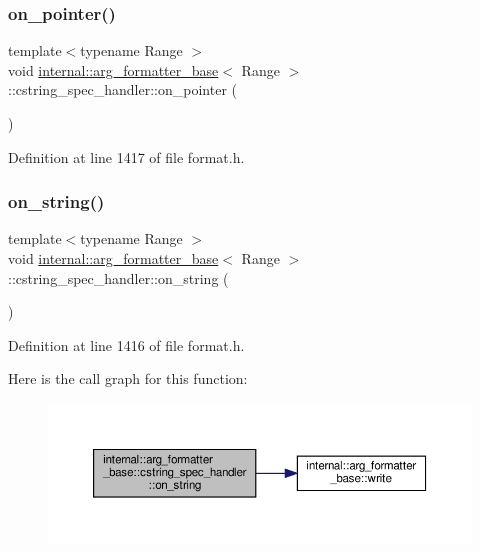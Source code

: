 \subsubsection{\texorpdfstring{on\+\_\+pointer()}{on\_pointer()}}
{\footnotesize\ttfamily template$<$typename Range $>$ \\
void \hyperlink{classinternal_1_1arg__formatter__base}{internal\+::arg\+\_\+formatter\+\_\+base}$<$ Range $>$\+::cstring\+\_\+spec\+\_\+handler\+::on\+\_\+pointer (\begin{DoxyParamCaption}{ }\end{DoxyParamCaption})\hspace{0.3cm}{\ttfamily [inline]}}



Definition at line 1417 of file format.\+h.

\mbox{\label{structinternal_1_1arg__formatter__base_1_1cstring__spec__handler_a3da22ca8cba834e783cfe8f3226efd36}} 
\subsubsection{\texorpdfstring{on\+\_\+string()}{on\_string()}}
{\footnotesize\ttfamily template$<$typename Range $>$ \\
void \hyperlink{classinternal_1_1arg__formatter__base}{internal\+::arg\+\_\+formatter\+\_\+base}$<$ Range $>$\+::cstring\+\_\+spec\+\_\+handler\+::on\+\_\+string (\begin{DoxyParamCaption}{ }\end{DoxyParamCaption})\hspace{0.3cm}{\ttfamily [inline]}}



Definition at line 1416 of file format.\+h.

Here is the call graph for this function\+:
\nopagebreak
\begin{figure}[H]
\begin{center}
\leavevmode
\includegraphics[width=350pt]{structinternal_1_1arg__formatter__base_1_1cstring__spec__handler_a3da22ca8cba834e783cfe8f3226efd36_cgraph}
\end{center}
\end{figure}


